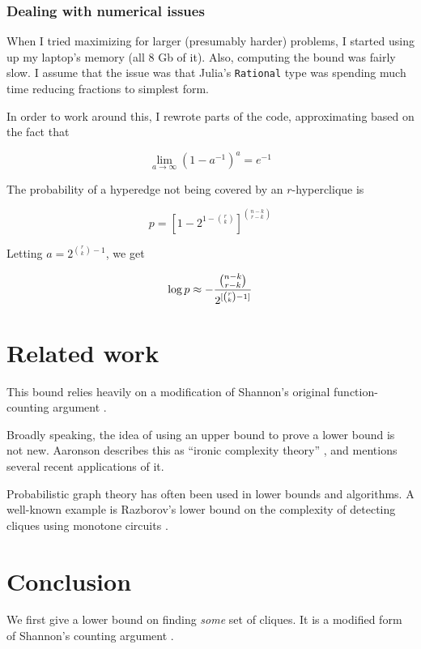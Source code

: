 \documentclass[12pt]{article}
\theoremstyle{definition}
\begin{document}
\subsubsection{Dealing with numerical issues}

When I tried maximizing for larger (presumably harder)
problems, I started using up my laptop's
memory (all 8 Gb of it). Also, computing the bound
was fairly slow. I assume that the
issue was that Julia's {\tt Rational} type was spending much time reducing
fractions to simplest form.

In order to work around this, I rewrote parts of the code,
approximating based on the fact that

\[
\lim_{a\to\infty} (1 - a^{-1})^{a} = e^{-1}
\]

The probability of a hyperedge not being covered by an $r$-hyperclique is

\[
p = [1 - 2 ^ {1-{r \choose k}}] ^ {n-k \choose r-k}
\]

Letting $a = 2^{{r \choose k}-1}$, we get

\[
\log p \approx - {{n-k \choose r-k} \over 2^{[{r \choose k}-1]}}
\]





\section{Related work}

This bound relies heavily on a modification of Shannon's original
function-counting argument \cite{shannon_synthesis_1949}.

Broadly speaking, the idea of using an upper bound to prove a lower bound
is not new. Aaronson describes this as ``ironic complexity theory''
\cite{aaronson_pnp}, and mentions several recent applications of it.

Probabilistic graph theory has often been used in
lower bounds and algorithms. A well-known example is Razborov's lower
bound on the complexity of detecting cliques using monotone circuits
\cite{Razborov85lowerbounds}.

\section{Conclusion}

We first give a lower bound on finding {\em some} set of cliques.
It is a modified form of Shannon's counting argument
\cite{shannon_synthesis_1949}.
\end{document}
